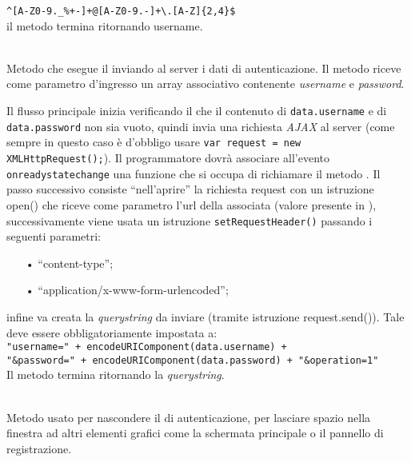 \begin{description}
	\verb|^[A-Z0-9._%+-]+@[A-Z0-9.-]+\.[A-Z]{2,4}$|
	\\
	
	il metodo termina ritornando username.	
	
	\item{}\\
	Metodo che esegue il  inviando al server i dati di autenticazione. Il metodo riceve come parametro d'ingresso un array associativo contenente \textit{username} e \textit{password}.
	
	Il flusso principale inizia verificando il che il contenuto di \texttt{data.username} e di \texttt{data.password} non sia vuoto, quindi invia una richiesta \textit{AJAX} al server (come sempre in questo caso è d'obbligo usare \verb|var request = new XMLHttpRequest();|).
	Il programmatore dovrà associare all'evento \texttt{onreadystatechange} una funzione che si occupa di richiamare il metodo . Il passo successivo consiste ``nell'aprire'' la richiesta request con un istruzione open() che riceve come parametro l'url della  associata (valore presente in ), successivamente viene usata un istruzione \texttt{setRequestHeader()} passando i seguenti parametri:
	\begin{itemize}
		\item[•] ``content-type'';
		\item[•] ``application/x-www-form-urlencoded'';
	\end{itemize}
	infine va creata la \textit{querystring} da inviare (tramite istruzione request.send()). Tale  deve essere obbligatoriamente impostata a:\\
	
	\verb|"username=" + encodeURIComponent(data.username) +|\\ \verb|"&password=" + encodeURIComponent(data.password) + "&operation=1"|\\
	
	Il metodo termina ritornando la \textit{querystring}.

	\item{}\\
	Metodo usato per nascondere il  di autenticazione, per lasciare spazio nella finestra ad altri elementi grafici come la schermata principale o il pannello di registrazione.
	

\end{description}
